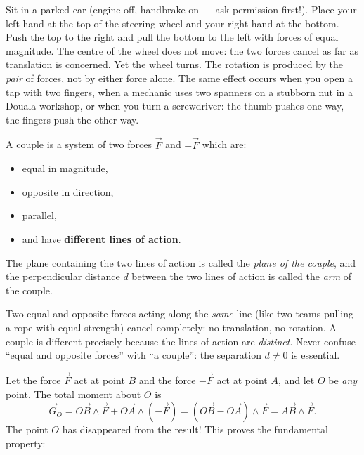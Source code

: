 \documentclass[11pt]{article}
\newcommand{\cle}[1]{{\popxbold\color{popdark}#1}}
\newcounter{popsec}
\newcounter{popsub}
\newcommand{\courssub}[1]{%
  \stepcounter{popsub}%
  \par\vspace{9pt}\noindent{\popxbold\fontsize{11.5}{13}\selectfont\color{popink}{\color{poporange}\thepopsec.\thepopsub}\hspace{6pt}#1}\par\nopagebreak\vspace{4pt}
}
\begin{document}
\begin{experience}
Sit in a parked car (engine off, handbrake on — ask permission first!). Place your left hand at the top of the steering wheel and your right hand at the bottom. Push the top to the right and pull the bottom to the left with forces of equal magnitude. The centre of the wheel does not move: the two forces cancel as far as translation is concerned. Yet the wheel turns. The rotation is produced by the \emph{pair} of forces, not by either force alone. The same effect occurs when you open a tap with two fingers, when a mechanic uses two spanners on a stubborn nut in a Douala workshop, or when you turn a screwdriver: the thumb pushes one way, the fingers push the other way.
\end{experience}

\begin{definition}[Couple]
A \cle{couple} is a system of two forces $\vec{F}$ and $-\vec{F}$ which are:
\begin{itemize}
\item equal in magnitude,
\item opposite in direction,
\item parallel,
\item and have \textbf{different lines of action}.
\end{itemize}
The plane containing the two lines of action is called the \emph{plane of the couple}, and the perpendicular distance $d$ between the two lines of action is called the \emph{arm} of the couple.
\end{definition}

\begin{attention}
Two equal and opposite forces acting along the \emph{same} line (like two teams pulling a rope with equal strength) cancel completely: no translation, no rotation. A couple is different precisely because the lines of action are \emph{distinct}. Never confuse ``equal and opposite forces'' with ``a couple'': the separation $d \neq 0$ is essential.
\end{attention}

\courssub{Moment of a Couple}

Let the force $\vec{F}$ act at point $B$ and the force $-\vec{F}$ act at point $A$, and let $O$ be \emph{any} point. The total moment about $O$ is
\[
\vec{G}_O = \vec{OB} \wedge \vec{F} + \vec{OA} \wedge (-\vec{F}) = (\vec{OB} - \vec{OA}) \wedge \vec{F} = \vec{AB} \wedge \vec{F}.
\]
The point $O$ has disappeared from the result! This proves the fundamental property:
\end{document}
